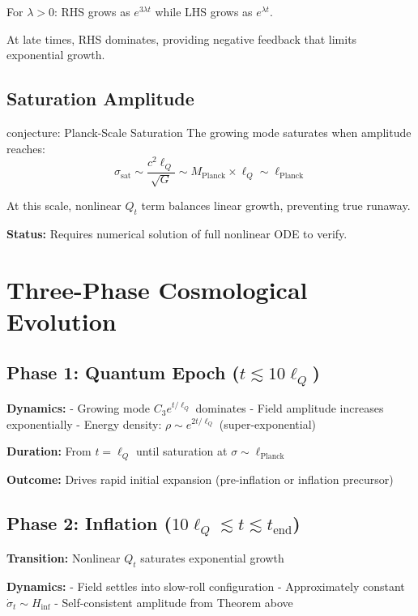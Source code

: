 \documentclass[11pt,a4paper]{article}
\theoremstyle{definition}
\theoremstyle{remark}
\begin{document}
		For $\lambda > 0$: RHS grows as $e^{3\lambda t}$ while LHS grows as $e^{\lambda t}$.
		
		At late times, RHS dominates, providing negative feedback that limits exponential growth.
	
	\subsection{Saturation Amplitude}
	
	conjecture: Planck-Scale Saturation
		The growing mode saturates when amplitude reaches:
		\begin{equation}
			\sigma_{\text{sat}} \sim \frac{c^2\ell_Q}{\sqrt{G}} \sim M_{\text{Planck}} \times \ell_Q \sim \ell_{\text{Planck}}
		\end{equation}
		
		At this scale, nonlinear $Q_t$ term balances linear growth, preventing true runaway.
	
	\textbf{Status:} Requires numerical solution of full nonlinear ODE to verify.
	
	\section{Three-Phase Cosmological Evolution}
	
	\subsection{Phase 1: Quantum Epoch ($t \lesssim 10\ell_Q$)}
	
	\textbf{Dynamics:}
	- Growing mode $C_3 e^{t/\ell_Q}$ dominates
	- Field amplitude increases exponentially
	- Energy density: $\rho \sim e^{2t/\ell_Q}$ (super-exponential)
	
	\textbf{Duration:} From $t = \ell_Q$ until saturation at $\sigma \sim \ell_{\text{Planck}}$
	
	\textbf{Outcome:} Drives rapid initial expansion (pre-inflation or inflation precursor)
	
	\subsection{Phase 2: Inflation ($10\ell_Q \lesssim t \lesssim t_{\text{end}}$)}
	
	\textbf{Transition:} Nonlinear $Q_t$ saturates exponential growth
	
	\textbf{Dynamics:}
	- Field settles into slow-roll configuration
	- Approximately constant $\dot{\sigma}_t \sim H_{\text{inf}}$
	- Self-consistent amplitude from Theorem above
	
\end{document}

